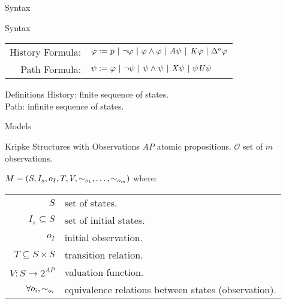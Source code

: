 \begin{frame}{\ctlskd\quad Syntax}

  \begin{block}{Syntax}
    \begin{tabular}{r l}
    History Formula: & $\varphi := p ~|~ \neg \varphi ~|~ \varphi\wedge\varphi ~|~ \mathit{A}\psi ~|~$\color{red!85!blue}$ \mathit{K}\varphi ~|~ \Delta^{o}\varphi$\\
    Path Formula: & $\psi := \varphi ~|~ \neg\psi ~|~ \psi\wedge\psi ~|~ \mathit{X}\psi ~|~ \psi\mathit{U}\psi$
    \end{tabular}
  \end{block}
  \vfill
  \begin{block}{Definitions}
    History: finite sequence of states.\\
    Path: infinite sequence of states.
  \end{block}
  
\end{frame}


\begin{frame}{\ctlskd\quad Models}

  \begin{block}{Kripke Structures with Observations}
    $AP$ atomic propositions.
    $\mathcal{O}$ set of $m$ observations.

    $M=(S,I_s,o_I,T,V,\sim_{o_1},\dots,\sim_{o_m})$ where:

    \begin{tabular}{r l}
      $S$& set of states.\\
      $I_s\subseteq S$& set of initial states.\\
      \color{red!85!blue}$o_I$& initial observation.\\
      $T\subseteq S\times S$& transition relation.\\
      $V:S\rightarrow 2^{\mathit{AP}}$& valuation function.\\
      \color{red!85!blue}$\forall o_i, \sim_{o_i}$& equivalence relations between states (observation).
    \end{tabular}
  \end{block}
  
\end{frame}


